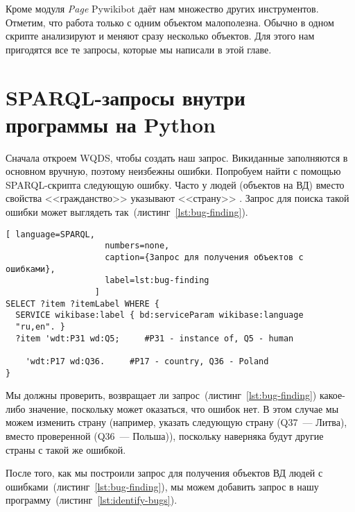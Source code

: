 
Кроме модуля \textit{Page} Pywikibot даёт нам множество других инструментов. Отметим, что работа только с одним объектом малополезна. Обычно в одном скрипте анализируют и меняют сразу несколько объектов. Для этого нам пригодятся все те запросы, которые мы написали в этой главе.

\section{SPARQL-запросы внутри программы на Python}
\label{sec:running queries}

Сначала откроем WQDS, чтобы создать наш запрос. Викиданные заполняются в основном вручную, поэтому неизбежны ошибки. Попробуем найти с помощью SPARQL-скрипта следующую ошибку. Часто у людей (объектов на ВД) вместо свойства <<гражданство>>  указывают <<страну>> .
Запрос для поиска такой ошибки может выглядеть так~(листинг~\ref{lst:bug-finding}).

\begin{lstlisting}[ language=SPARQL,
                    numbers=none,
                    caption={Запрос для получения объектов с ошибками},
                    label=lst:bug-finding
                  ]
SELECT ?item ?itemLabel WHERE {
  SERVICE wikibase:label { bd:serviceParam wikibase:language 
  "ru,en". }
  ?item 'wdt:P31 wd:Q5;     #P31 - instance of, Q5 - human
    
    'wdt:P17 wd:Q36.     #P17 - country, Q36 - Poland
}
\end{lstlisting}       

Мы должны проверить, возвращает ли запрос~(листинг~\ref{lst:bug-finding}) какое-либо значение, поскольку может оказаться, что ошибок нет. В этом случае мы можем изменить страну (например, указать следующую страну (Q37~--- Литва), вместо проверенной (Q36~--- Польша)), поскольку наверняка будут другие страны с такой же ошибкой.

После того, как мы построили запрос для получения объектов ВД людей с ошибками~(листинг~\ref{lst:bug-finding}), мы можем добавить запрос в нашу программу~(листинг~\ref{lst:identify-bugs}).

